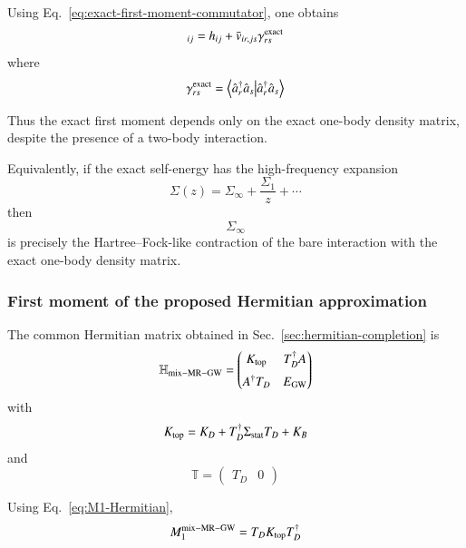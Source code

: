\documentclass[aip,jcp,reprint,noshowkeys,superscriptaddress]{revtex4-1}
\begin{document}
Using Eq.~\eqref{eq:exact-first-moment-commutator}, one obtains
\begin{equation}
  [M_1^{\rm exact}]_{ij}
  =
  h_{ij}
  +
  \bar v_{ir,js}
  \gamma_{rs}^{\rm exact}
  \label{eq:M1-exact-two-body}
\end{equation}
where
\begin{equation}
  \gamma_{rs}^{\rm exact}
  =
  \braket{
    \hat a_r^\dagger
    \hat a_s
  }
\end{equation}

Thus the exact first moment depends only on the exact one-body density
matrix, despite the presence of a two-body interaction.

Equivalently, if the exact self-energy has the high-frequency
expansion
\begin{equation}
  \Sigma(z)
  =
  \Sigma_\infty
  +
  \frac{\Sigma_1}{z}
  +
  \cdots
\end{equation}
then
\begin{equation}
  \Sigma_\infty
\end{equation}
is precisely the Hartree--Fock-like contraction of the bare
interaction with the exact one-body density matrix.


\subsubsection{First moment of the proposed Hermitian approximation}

The common Hermitian matrix obtained in Sec.~\ref{sec:hermitian-completion} is
\begin{equation}
  \mathbb H_{\rm mix-MR-GW}
  =
  \begin{pmatrix}
    K_{\rm top}
    &
    T_D^\dagger A
    \\[2mm]
    A^\dagger T_D
    &
    E_{\rm GW}
  \end{pmatrix}
  \label{eq:H-task6}
\end{equation}
with
\begin{equation}
  K_{\rm top}
  =
  K_D
  +
  T_D^\dagger
  \Sigma_{\rm stat}
  T_D
  +
  K_B
  \label{eq:Ktop-task6}
\end{equation}
and
\begin{equation}
  \mathbb T
  =
  \begin{pmatrix}
    T_D&0
  \end{pmatrix}
\end{equation}

Using Eq.~\eqref{eq:M1-Hermitian},
\begin{equation}
  M_1^{\rm mix-MR-GW}
  =
  T_DK_{\rm top}T_D^\dagger
\end{equation}
\end{document}
